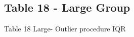\documentclass{beamer}					%
\begin{document}
%		
	
	\subsection{Table 18 - Large Group}
	
	\begin{frame}{Table 18 Large- Outlier procedure IQR}
		
	\end{frame}

%		
	
%	
%			
%	
	
%		
	
	
\end{document}
